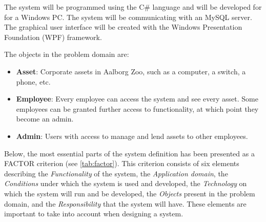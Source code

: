 The system will be programmed using the C\# language and will be developed for for a Windows PC. The system will be communicating with an MySQL server. The graphical user interface will be created with the Windows Presentation Foundation (WPF) framework.
\par
The objects in the problem domain are: 
\begin{itemize}
    \item \textbf{Asset}: Corporate assets in Aalborg Zoo, such as a computer, a switch, a phone, etc.

    
    \item \textbf{Employee}: Every employee can access the system and see every asset. Some employees can be granted further access to functionality, at which point they become an admin.
    
    \item \textbf{Admin}: Users with access to manage and lend assets to other employees.
\end{itemize}

Below, the most essential parts of the system definition has been presented as a FACTOR criterion \cite{OOAD}(see \autoref{tab:factor}). This criterion consists of six elements describing the \textit{Functionality} of the system, the \textit{Application domain}, the \textit{Conditions} under which the system is used and developed, the \textit{Technology} on which the system will run and be developed, the \textit{Objects} present in the problem domain, and the \textit{Responsibility} that the system will have. These elements are important to take into account when designing a system. 